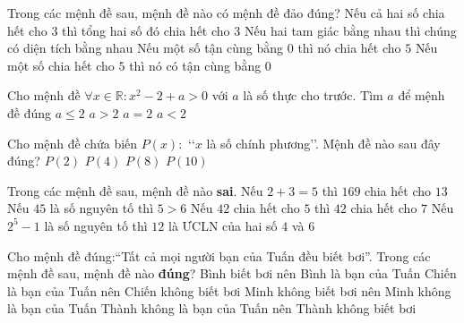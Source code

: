 \begin{ex}%
	Trong các  mệnh đề sau, mệnh đề nào có mệnh đề đảo đúng?
	\choice 
		{Nếu cả hai số chia hết cho $3$ thì tổng hai  số đó chia hết cho $3$}
		{Nếu hai tam giác bằng nhau thì chúng có diện  tích bằng nhau}
		{Nếu một  số tận cùng bằng $0$ thì nó chia hết cho $5$}
		{\True Nếu một số chia hết cho $5$ thì nó  có tận cùng bằng $0$}
\end{ex}

\begin{ex}%
	Cho mệnh đề $\forall x \in \mathbb{R} \colon x^2-2+a>0$ với $a$ là số thực cho trước. Tìm $a$ để  mệnh đề đúng
	 \choice
		 {$a \leq 2$}
		{\True $a>2$} 
		{$a=2$} 
		{$a<2$} 
\end{ex}

\begin{ex}%
	Cho mệnh đề chứa biến $P(x):$ \lq\lq$x$ là số chính phương\rq\rq. Mệnh đề nào sau đây đúng? 
	 \choice
		 {$P(2)$}
		{\True $P(4)$} 
		{$P(8)$} 
		{$P(10)$} 
\end{ex}

\begin{ex}%
	Trong các mệnh đề sau, mệnh  đề nào \textbf{sai}.
	\choice 
		{Nếu $2+3=5$ thì $169$ chia hết  cho $13$}
		{Nếu $45$ là số nguyên  tố thì $5>6$}
		{Nếu $42$ chia hết cho $5$ thì $42$ chia hết cho  $7$}
		{\True Nếu $2^{5}-1$ là  số nguyên tố thì $12$ là ƯCLN của hai số $4$ và $6$ }
\end{ex}

\begin{ex}%
	Cho  mệnh đề đúng:``Tất cả mọi người bạn của Tuấn đều biết bơi''. Trong các mệnh đề sau, mệnh đề nào \textbf{đúng}?
	\choice 
		{Bình biết bơi nên Bình là bạn của Tuấn} 
		{Chiến là bạn của Tuấn nên Chiến không biết  bơi }
		{\True Minh  không biết bơi nên Minh không là bạn của Tuấn}
		{Thành không là bạn của Tuấn nên  Thành không biết bơi}
\end{ex}

